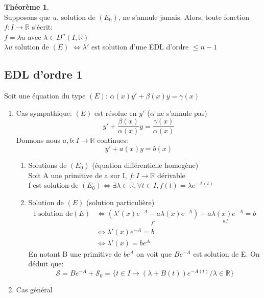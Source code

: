 \documentclass[fleqn]{article}
\theoremstyle{definition} \newtheorem*{defi}{D\'efinition}
\theoremstyle{definition} \newtheorem*{theo}{Th\'eor\`eme}
\theoremstyle{remark} \newtheorem*{rqs}{Remarques}
\begin{document}
\begin{theo} $ $\\
	Supposons que $u$, solution de $(E_0)$, ne s'annule jamais. Alors, toute fonction $f: I \rightarrow \mathbb{R}$ s'\'ecrit:\\
	$f = \lambda u$ avec $\lambda \in D^n(I, \mathbb{R})$ \\
	$\lambda u$ solution de $(E)$ $\Leftrightarrow \lambda '$ est solution d'une EDL d'ordre $\leq n-1$
\end{theo}

\subsection{EDL d'ordre 1}
Soit une \'equation du type $(E)$: $\alpha(x)y' + \beta(x)y = \gamma(x)$

\begin{enumerate}
	\item Cas sympathique: $(E)$ est r\'esolue en $y'$ ($\alpha$ ne s'annule pas)
		\[y' + \frac{\beta(x)}{\alpha(x)}y = \frac{\gamma(x)}{\alpha(x)}\]
		Donnons nous $a, b : I \rightarrow \mathbb{R}$ continues:
		\[y' + a(x)y = b(x)\]
		\begin{enumerate}
			\item Solutions de $(E_0)$ (\'equation diff\'erentielle homog\`ene)\\
				Soit A une primitive de a sur I, $f: I \rightarrow \mathbb{R}$ d\'erivable\\
				f est solution de $(E_0) \Leftrightarrow \exists \lambda \in \mathbb{R}, \forall t \in I, f(t) = \lambda e^{-A(t)}$
			\item Solution de $(E)$ (solution particuli\`ere)
				\begin{align*}
					\text{f solution de} (E) &\Leftrightarrow \underset{f'}{(\lambda'(x) e^{-A} - a \lambda(x) e^{-A})} +
					\underset{af}{a \lambda(x) e^{-A}} = b\\
					&\Leftrightarrow \lambda'(x) e^{-A} = b \\
					&\Leftrightarrow \lambda'(x) = be^A
				\end{align*}
				En notant B une primitive de $be^A$ on voit que $Be^{-A}$ est solution de E. On d\'eduit que:\\
				\[\mathscr{S} = Be^{-A} + \mathscr{S}_0 = \{t\in I \mapsto (\lambda + B(t))e^{-A(t)}/ \lambda \in \mathbb{R}\}\]
		\end{enumerate}
	\item Cas g\'en\'eral
		\begin{enumerate}

\end{enumerate}
\end{enumerate}
\end{document}
